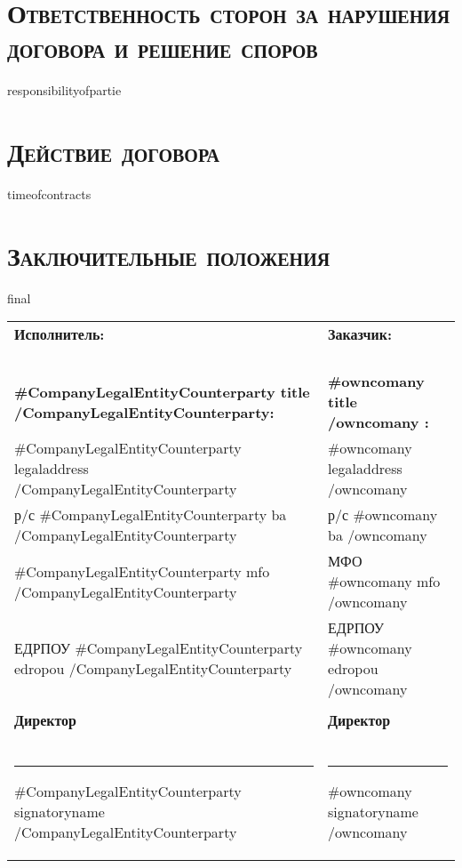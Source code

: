 {{{{{{\section{\large \textbf{\textsc{Ответственность сторон за нарушения договора и решение споров}}}
{{responsibilityofpartie}}

\section{\large \textbf{\textsc{Действие договора}}}
{{timeofcontracts}}

\section{\large \textbf{\textsc{Заключительные положения}}}
{{final}}

\thispagestyle{empty}
\begin{tabularx}{\textwidth}{ X@{\hskip 0.5in} X }

\textbf{Исполнитель:}  & \textbf{Заказчик:} \\
 & \\
 & \\
 & \\
 & \\
 \textbf{ {{#CompanyLegalEntityCounterparty}} {{title}}  {{/CompanyLegalEntityCounterparty}}:} & \textbf{ {{#owncomany}} {{title}} {{/owncomany}} :} \\
 {{#CompanyLegalEntityCounterparty}} {{legaladdress}}  {{/CompanyLegalEntityCounterparty}}  &  {{#owncomany}}  {{legaladdress}}  {{/owncomany}}  \\
 р/с   {{#CompanyLegalEntityCounterparty}} {{ba}}  {{/CompanyLegalEntityCounterparty}}                                                &  р/с  {{#owncomany}}  {{ba}}  {{/owncomany}}  \\
 {{#CompanyLegalEntityCounterparty}} {{mfo}}  {{/CompanyLegalEntityCounterparty}} &  МФО {{#owncomany}}  {{mfo}}   {{/owncomany}}   \\
 ЕДРПОУ {{#CompanyLegalEntityCounterparty}} {{edropou}}  {{/CompanyLegalEntityCounterparty}} & ЕДРПОУ {{#owncomany}} {{edropou}}  {{/owncomany}}  \\
 & \\
 \textbf{Директор}  & \textbf{Директор} \\
 & \\
 & \\
 & \\
 \noindent\rule{4cm}{0.5pt} {{#CompanyLegalEntityCounterparty}} {{signatoryname}}  {{/CompanyLegalEntityCounterparty}}   & \noindent\rule{5cm}{0.5pt} {{#owncomany}} {{signatoryname}}  {{/owncomany}}  \\
 \end{tabularx}


}}}}}}
